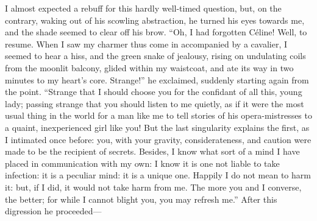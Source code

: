 I almost expected a rebuff for this hardly well-timed question, but, on
the contrary, waking out of his scowling abstraction, he turned his eyes
towards me, and the shade seemed to clear off his brow. \enquote{Oh, I
	had forgotten Céline! Well, to resume. When I saw my charmer thus come
	in accompanied by a cavalier, I seemed to hear a hiss, and the green
	snake of jealousy, rising on undulating coils from the moonlit balcony,
	glided within my waistcoat, and ate its way in two minutes to my heart's
	core. Strange!} he exclaimed, suddenly starting again from the point.
\enquote{Strange that I should choose you for the confidant of all this,
	young lady; passing strange that you should listen to me quietly, as if
	it were the most usual thing in the world for a man like me to tell
	stories of his opera-mistresses to a quaint, inexperienced girl like
	you! But the last singularity explains the first, as I intimated once
	before: you, with your gravity, considerateness, and caution were made
	to be the recipient of secrets. Besides, I know what sort of a mind I
	have placed in communication with my own: I know it is one not liable to
	take infection: it is a peculiar mind: it is a unique one. Happily I do
	not mean to harm it: but, if I did, it would not take harm from me. The
	more you and I converse, the better; for while I cannot blight you, you
	may refresh me.} After this digression he proceeded---


